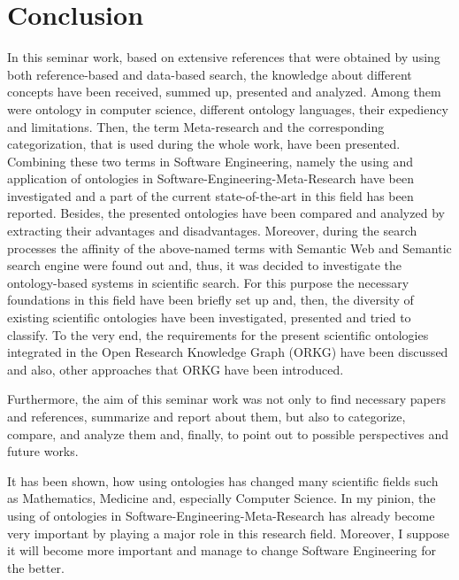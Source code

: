 
\section{Conclusion}
\label{ch:Conclusion}

In this seminar work, based on extensive references that were obtained by using both reference-based and data-based search, the knowledge about different concepts have been received, summed up, presented and analyzed. Among them were ontology in computer science, different ontology languages, their expediency and limitations. Then, the term Meta-research and the corresponding categorization, that is used during the whole work, have been presented. Combining these two terms in Software Engineering, namely the using and application of ontologies in Software-Engineering-Meta-Research have been investigated and a part of the current state-of-the-art in this field has been reported. Besides, the presented ontologies have been compared and analyzed by extracting their advantages and disadvantages. Moreover, during the search processes the affinity of the above-named terms with Semantic Web and Semantic search engine were found out and, thus, it was decided to investigate the ontology-based systems in scientific search. For this purpose the necessary foundations in this field have been briefly set up and, then, the diversity of existing scientific ontologies have been investigated, presented and tried to classify. To the very end, the requirements for the present scientific ontologies integrated in the Open Research Knowledge Graph (ORKG) have been discussed and also, other approaches that ORKG have been introduced.

Furthermore, the aim of this seminar work was not only to find necessary papers and references, summarize and report about them, but also to categorize, compare, and analyze them and, finally, to point out to possible perspectives and future works. 

It has been shown, how using ontologies has changed many scientific fields such as Mathematics, Medicine and, especially Computer Science. In my pinion, the using of  ontologies in Software-Engineering-Meta-Research has already become very important by playing a major role in this research field. Moreover, I suppose it will become more important and manage to change Software Engineering for the better.       